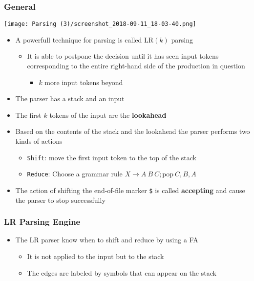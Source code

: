 \documentclass[11pt]{article}
\begin{document}
\subsubsection{General}
\label{sec:org4f19358}
\begin{center}
\texttt{[image: Parsing (3)/screenshot\_2018-09-11\_18-03-40.png]}
\end{center}

\begin{itemize}
\item A powerfull technique for parsing is called \(\text{LR}(k)\) parsing
\begin{itemize}
\item It is able to postpone the decision until it has seen input tokens corresponding to the entire right-hand side of the production in question
\begin{itemize}
\item \(k\) more input tokens beyond
\end{itemize}
\end{itemize}

\item The parser has a stack and an input
\item The first \(k\) tokens of the input are the \textbf{lookahead}
\item Based on the contents of the stack and the lookahead the parser performs two kinds of actions
\begin{itemize}
\item \texttt{Shift}: move the first input token to the top of the stack
\item \texttt{Reduce}: Choose a grammar rule \(X \to A \ B \ C; \text{pop} \ C,B,A\)
\end{itemize}
\item The action of shifting the end-of-file marker \texttt{\$} is called \textbf{accepting} and cause the parser to stop successfully
\end{itemize}

\subsubsection{LR Parsing Engine}
\label{sec:orgf9a661c}
\begin{itemize}
\item The LR parser know when to shift and reduce by using a FA
\begin{itemize}
\item It is not applied to the input but to the stack
\item The edges are labeled by symbols that can appear on the stack
\end{itemize}
\end{itemize}
\end{document}

